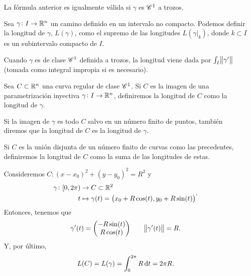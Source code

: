 \begin{obs}
    La fórmula anterior es igualmente válida si $\gamma$ es $\mathscr{C}^1$ a trozos.
\end{obs}

\begin{defi}
    Sea $\gamma \colon I \to \mathbb{R}^n$ un camino definido en un intervalo no compacto. Podemos definir la longitud de $\gamma$, $L(\gamma)$,
    como el supremo de las longitudes $L(\gamma\vert_{k})$, donde $k \subset I$ es un subintervalo compacto de $I$.

    Cuando $\gamma$ es de clase $\mathscr{C}^1$ definida a trozos, la longitud viene dada por $\int_I \norm{\gamma^\prime}$ (tomada como integral impropia si es necesario).
\end{defi}


\begin{defi} \label{defi:observaciones_curvas}
    Sea $C \subset \mathbb{R}^n$ una curva regular de clase $\mathscr{C}^1$. Si $C$ es la imagen de una parametrización inyectiva $\gamma \colon I \to \mathbb{R}^n$, definiremos la longitud de $C$ como la longitud de $\gamma$.

    Si la imagen de $\gamma$ es todo $C$ salvo en un número finito de puntos, tambi\'en diremos que la longitud de $C$ es la longitud de $\gamma$.

    Si $C$ es la unión disjunta de un número finito de curvas como las precedentes, definiremos la longitud de $C$ como la suma de las longitudes
    de estas.
\end{defi}

\begin{example}
    Consideremos $C \colon \left( x - x_0 \right)^2 + \left( y - y_0 \right)^2 = R^2$ y
    \[
        \begin{aligned}
            \gamma \colon [0,2\pi) &\to C \subset \mathbb{R}^2 \\
            t &\mapsto \gamma(t) = \left( x_0 + R\cos(t), y_0 + R\sin(t) \right)
        \end{aligned}.
    \]
    Entonces, tenemos que
    \[
        \gamma^\prime(t) = \begin{pmatrix} -R\sin(t) \\ R \cos(t) \end{pmatrix} \qquad
        \norm{\gamma^\prime(t)} = R.
    \]
    Y, por último,
    \[
        L(C) = L(\gamma) = \int^{2\pi}_0 R \dif t = 2\pi R.
    \]
\end{example}

